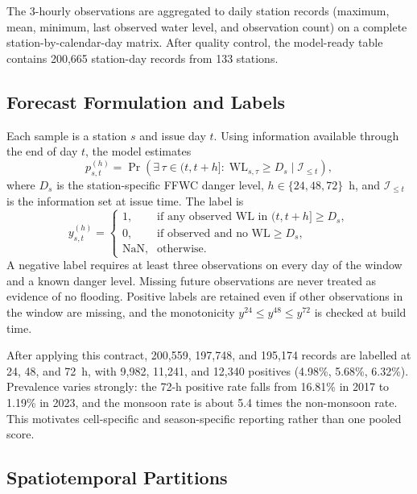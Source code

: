 \documentclass[conference]{IEEEtran}
\begin{document}
The 3-hourly observations are aggregated to daily station records (maximum, mean, minimum, last observed water level, and observation count) on a complete station-by-calendar-day matrix. After quality control, the model-ready table contains 200{,}665 station-day records from 133 stations.

\subsection{Forecast Formulation and Labels}

Each sample is a station $s$ and issue day $t$. Using information available through the end of day $t$, the model estimates
\begin{equation}
p^{(h)}_{s,t} = \Pr\!\left(\exists\, \tau \in (t, t+h]:\; \mathrm{WL}_{s,\tau} \geq D_s \mid \mathcal{I}_{\leq t}\right),
\end{equation}
where $D_s$ is the station-specific FFWC danger level, $h\in\{24,48,72\}$~h, and $\mathcal{I}_{\leq t}$ is the information set at issue time. The label is
\begin{equation}
y^{(h)}_{s,t}=
\begin{cases}
1, & \text{if any observed WL in }(t,t+h] \geq D_s,\\
0, & \text{if observed and no WL} \geq D_s,\\
\text{NaN}, & \text{otherwise.}
\end{cases}
\end{equation}
A negative label requires at least three observations on every day of the window and a known danger level. Missing future observations are never treated as evidence of no flooding. Positive labels are retained even if other observations in the window are missing, and the monotonicity $y^{24}\!\leq\! y^{48}\!\leq\! y^{72}$ is checked at build time.

After applying this contract, 200{,}559, 197{,}748, and 195{,}174 records are labelled at 24, 48, and 72~h, with 9{,}982, 11{,}241, and 12{,}340 positives (4.98\%, 5.68\%, 6.32\%). Prevalence varies strongly: the 72-h positive rate falls from 16.81\% in 2017 to 1.19\% in 2023, and the monsoon rate is about 5.4 times the non-monsoon rate. This motivates cell-specific and season-specific reporting rather than one pooled score.

\subsection{Spatiotemporal Partitions}
\end{document}
